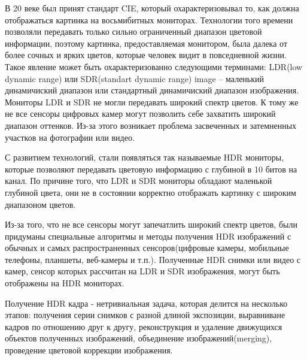 \Introduction

В 20 веке был принят стандарт CIE, который охарактеризовывал то, как должна отображаться картинка на восьмибитных мониторах. Технологии того времени позволяли передавать только сильно ограниченный диапазон цветовой информации, поэтому картинка, предоставляемая монитором, была далека от более сочных и ярких цветов, которые человек видит в повседневной жизни. Такое явление может быть охарактеризованно следующими терминами: LDR(low dynamic range) или SDR(standart dynamic range) image -- маленький динамичиский диапазон или стандартный динамичиский диапазон изображения. Мониторы LDR и SDR не могли передавать широкий спектр цветов. К тому же не все сенсоры цифровых камер могут позволить себе захватить широкий диапазон оттенков. Из-за этого возникает проблема засвеченных и затемненных участков на фотографии или видео.

С развитием технологий, стали появляться так называемые HDR мониторы, которые позволяют передавать цветовую информацию с глубиной в 10 битов на канал. По причине того, что LDR и SDR мониторы обладают маленькой глубиной цвета, они не в состоянии корректно отображать картинку с широким диапазоном цветов.

Из-за того, что не все сенсоры могут запечатлить широкий спектр цветов, были придуманы специальные алгоритмы и методы получения HDR изображений с обычных и самых распространенных сенсоров(цифровые камеры, мобильные телефоны, планшеты, веб-камеры и т.п.). Полученные HDR снимки или видео с камер, сенсор которых рассчитан на LDR и SDR изображения, могут быть отображены на HDR мониторах.

Получение HDR кадра - нетривиальная задача, которая делится на несколько этапов: получения серии снимков с разной длиной экспозиции, выравниване кадров по отношению друг к другу, реконструкция и удаление движущихся объектов полученных изображений, объединение изображений(merging), проведение цветовой коррекции изображения.
